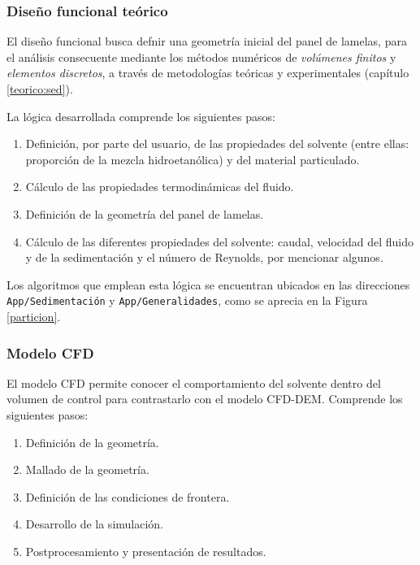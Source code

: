 \subsubsection{Dise\~no funcional te\'orico}

\noindent
\justify

El dise\~no funcional busca defnir una geometr\'ia inicial del panel de lamelas, para el an\'alisis consecuente mediante los m\'etodos num\'ericos de \textit{vol\'umenes finitos} y \textit{elementos discretos}, a trav\'es de metodolog\'ias te\'oricas y experimentales (cap\'itulo \ref{teorico:sed}).

\noindent
\justify

La l\'ogica desarrollada comprende los siguientes pasos:

\begin{enumerate}
	\item Definici\'on, por parte del usuario, de las propiedades del solvente (entre ellas: proporci\'on de la mezcla hidroetan\'olica) y del material particulado.
	\item C\'alculo de las propiedades termodin\'amicas del fluido.
	\item Definici\'on de la geometr\'ia del panel de lamelas.
	\item C\'alculo de las diferentes propiedades del solvente: caudal, velocidad del fluido y de la sedimentaci\'on y el n\'umero de Reynolds, por mencionar algunos.
\end{enumerate}

\noindent
\justify

Los algoritmos que emplean esta l\'ogica se encuentran ubicados en las direcciones \texttt{App/Sedimentaci\'on} y \texttt{App/Generalidades}, como se aprecia en la Figura \ref{particion}.

\subsubsection{Modelo CFD} \label{imp:CFD}

\noindent
\justify

El modelo CFD permite conocer el comportamiento del solvente dentro del volumen de control para contrastarlo con el modelo CFD-DEM. Comprende los siguientes pasos:

\begin{enumerate}
	\item Definici\'on de la geometr\'ia.
	\item Mallado de la geometr\'ia.
	\item Definici\'on de las condiciones de frontera.
	\item Desarrollo de la simulaci\'on.
	\item Postprocesamiento y presentaci\'on de resultados.
\end{enumerate}

